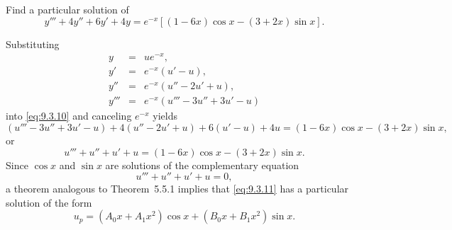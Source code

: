 \setcounter{example}{3}
\setcounter{equation}{9}
\begin{example}
  \label{example:9.3.4} \rm Find a particular solution of
  \begin{equation}
    \label{eq:9.3.10}y'''+4y''+6y'+4y= e^{-x}\left[(1-6x)\cos x-(3+2x)\sin x\right].
  \end{equation}
\end{example}
\setcounter{equation}{10}
\setcounter{figure}{3}
\begin{examplesolution}
\solution Substituting
\begin{eqnarray*}
  y    & = & ue^{-x},           \\
  y'   & = & e^{-x}(u'-u),      \\
  y''  & = & e^{-x}(u''-2u'+u), \\
  y''' & = & e^{-x}(u'''-3u''+3u'-u)
\end{eqnarray*}
into \eqref{eq:9.3.10} and canceling $e^{-x}$ yields
\[
  (u'''-3u''+3u'-u)+4(u''-2u'+u)+6(u'-u)+4u =(1-6x)\cos x-(3+2x)\sin x,
\]
or
\begin{equation}
  \label{eq:9.3.11}u'''+u''+u'+u=(1-6x)\cos x-(3+2x)\sin x.
\end{equation}
Since $\cos x$ and $\sin x$ are solutions of the complementary equation
\[
  u'''+u''+u'+u=0,
\]
a theorem analogous to Theorem~5.5.1 implies that \eqref{eq:9.3.11} has a particular
solution of the form
\begin{equation}
  \label{eq:9.3.12}u_{p}=(A_{0}x+A_{1}x^{2})\cos x+(B_{0}x+B_{1}x^{2})\sin x.
\end{equation}


\end{examplesolution}
